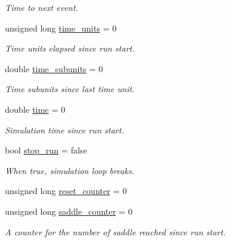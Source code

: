 \begin{DoxyCompactItemize}
\begin{DoxyCompactList}\small\item\em Time to next event. \end{DoxyCompactList}\item 
\hypertarget{classLifNetSim_a5fe7b525f0660517c94f8ed28d5bf50d}{unsigned long \hyperlink{classLifNetSim_a5fe7b525f0660517c94f8ed28d5bf50d}{time\-\_\-units} = 0}\label{classLifNetSim_a5fe7b525f0660517c94f8ed28d5bf50d}

\begin{DoxyCompactList}\small\item\em Time units elapsed since run start. \end{DoxyCompactList}\item 
\hypertarget{classLifNetSim_aac7ffbe0f159c3b7dfcad41e821984f6}{double \hyperlink{classLifNetSim_aac7ffbe0f159c3b7dfcad41e821984f6}{time\-\_\-subunits} = 0}\label{classLifNetSim_aac7ffbe0f159c3b7dfcad41e821984f6}

\begin{DoxyCompactList}\small\item\em Time subunits since last time unit. \end{DoxyCompactList}\item 
\hypertarget{classLifNetSim_a2bdf758ccdb5273b1bb527457c979f4a}{double \hyperlink{classLifNetSim_a2bdf758ccdb5273b1bb527457c979f4a}{time} = 0}\label{classLifNetSim_a2bdf758ccdb5273b1bb527457c979f4a}

\begin{DoxyCompactList}\small\item\em Simulation time since run start. \end{DoxyCompactList}\item 
\hypertarget{classLifNetSim_a810a3a633dd3d53de8af374579a9367e}{bool \hyperlink{classLifNetSim_a810a3a633dd3d53de8af374579a9367e}{stop\-\_\-run} = false}\label{classLifNetSim_a810a3a633dd3d53de8af374579a9367e}

\begin{DoxyCompactList}\small\item\em When true, simulation loop breaks. \end{DoxyCompactList}\item 
unsigned long \hyperlink{classLifNetSim_a2f3f9325c55f056f06f07ebd0244a1c3}{reset\-\_\-counter} = 0
\item 
\hypertarget{classLifNetSim_acca6feadac5c19ae605b6571b6b3cd44}{unsigned long \hyperlink{classLifNetSim_acca6feadac5c19ae605b6571b6b3cd44}{saddle\-\_\-counter} = 0}\label{classLifNetSim_acca6feadac5c19ae605b6571b6b3cd44}

\begin{DoxyCompactList}\small\item\em A counter for the number of saddle reached since run start. \end{DoxyCompactList}\end{DoxyCompactItemize}


